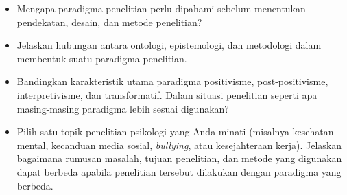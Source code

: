 \documentclass[
  indonesian,
  letterpaper,
  DIV=11,
  numbers=noendperiod]{scrreprt}
\providecommand{\tightlist}{%
  \setlength{\itemsep}{0pt}\setlength{\parskip}{0pt}}
\begin{document}
\begin{tcolorbox}[enhanced jigsaw, colframe=quarto-callout-important-color-frame, toptitle=1mm, breakable, leftrule=.75mm, arc=.35mm, toprule=.15mm, colback=white, colbacktitle=quarto-callout-important-color!10!white, bottomtitle=1mm, bottomrule=.15mm, titlerule=0mm, title=\textcolor{quarto-callout-important-color}{\faExclamation}\hspace{0.5em}{Refleksi \& Diskusi}, coltitle=black, left=2mm, opacitybacktitle=0.6, opacityback=0, rightrule=.15mm]

\begin{itemize}
\tightlist
\item
  Mengapa paradigma penelitian perlu dipahami sebelum menentukan
  pendekatan, desain, dan metode penelitian?
\item
  Jelaskan hubungan antara ontologi, epistemologi, dan metodologi dalam
  membentuk suatu paradigma penelitian.
\item
  Bandingkan karakteristik utama paradigma positivisme,
  post-positivisme, interpretivisme, dan transformatif. Dalam situasi
  penelitian seperti apa masing-masing paradigma lebih sesuai digunakan?
\item
  Pilih satu topik penelitian psikologi yang Anda minati (misalnya
  kesehatan mental, kecanduan media sosial, \emph{bullying}, atau
  kesejahteraan kerja). Jelaskan bagaimana rumusan masalah, tujuan
  penelitian, dan metode yang digunakan dapat berbeda apabila penelitian
  tersebut dilakukan dengan paradigma yang berbeda.
\end{itemize}

\end{tcolorbox}
\end{document}

